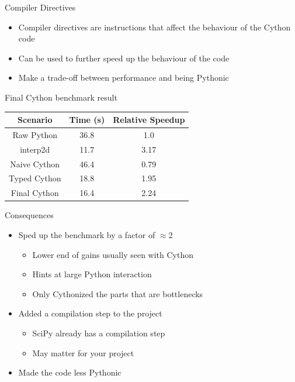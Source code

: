 \documentclass[12pt,xcolor=dvipsnames]{beamer}
\begin{document}
    \begin{frame}{Compiler Directives}
        \begin{itemize}
            \item Compiler directives are instructions that affect the behaviour of the Cython code
            \item Can be used to further speed up the behaviour of the code
            \item Make a trade-off between performance and being Pythonic
        \end{itemize}
        
    \end{frame}

    \begin{frame}{Final Cython benchmark result}
        \begin{center}
        \begin{tabular}{ | c | c | c | }
            \hline
            Scenario & Time (s) & Relative Speedup \\
            \hline
            Raw Python & 36.8 & 1.0 \\
            interp2d & 11.7 & 3.17 \\
            Naive Cython & 46.4 & 0.79 \\
            Typed Cython & 18.8 & 1.95 \\
            Final Cython & 16.4 & 2.24 \\
            \hline
        \end{tabular}
        \end{center}
    \end{frame}

    \begin{frame}{Consequences}
        \begin{itemize}
            \item Sped up the benchmark by a factor of $\approx$2
            \begin{itemize}
                \item Lower end of gains usually seen with Cython
                \item Hints at large Python interaction
                \item Only Cythonized the parts that are bottlenecks
            \end{itemize}
            \item Added a compilation step to the project
            \begin{itemize}
                \item SciPy already has a compilation step
                \item May matter for your project
            \end{itemize}
            \item Made the code less Pythonic
        \end{itemize}
    \end{frame}
\end{document}
